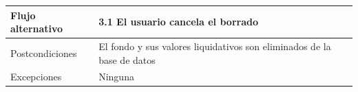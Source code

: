 \documentclass[12pt, a4paper]{book}
\begin{document}
\begin{table}[htbp]
\begin{tabular}{|l|l|}
		Flujo alternativo & 3.1 El usuario cancela el borrado                                                                                                                                                                                                                                                                                                    \\ \hline
		Postcondiciones   & El fondo y sus valores liquidativos son eliminados de la base de datos                                                                                                                                                                                                                                                                                               \\ \hline
		Excepciones       & Ninguna                                                                                                                                                                    \\ \hline
	\end{tabular}
\end{table}
\end{document}
